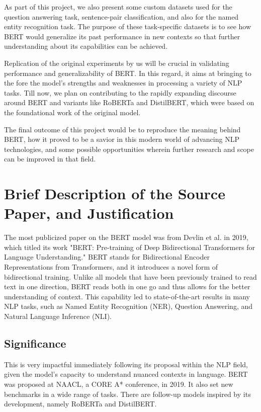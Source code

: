 \documentclass{article}
\begin{document}
As part of this project, we also present some custom datasets used for the question answering task, sentence-pair classification, and also for the named entity recognition task. The purpose of these task-specific datasets is to see how BERT would generalize its past performance in new contexts so that further understanding about its capabilities can be achieved.

Replication of the original experiments by us will be crucial in validating performance and generalizability of BERT. In this regard, it aims at bringing to the fore the model's strengths and weaknesses in processing a variety of NLP tasks. Till now, we plan on contributing to the rapidly expanding discourse around BERT and variants like RoBERTa and DistilBERT, which were based on the foundational work of the original model.

The final outcome of this project would be to reproduce the meaning behind BERT, how it proved to be a savior in this modern world of advancing NLP technologies, and some possible opportunities wherein further research and scope can be improved in that field.

\section{Brief Description of the Source Paper, and Justification}
The most publicized paper on the BERT model was from Devlin et al. in 2019, which titled its work "BERT: Pre-training of Deep Bidirectional Transformers for Language Understanding." BERT stands for Bidirectional Encoder Representations from Transformers, and it introduces a novel form of bidirectional training. Unlike all models that have been previously trained to read text in one direction, BERT reads both in one go and thus allows for the better understanding of context. This capability led to state-of-the-art results in many NLP tasks, such as Named Entity Recognition (NER), Question Answering, and Natural Language Inference (NLI).

\subsection{Significance}
This is very impactful immediately following its proposal within the NLP field, given the model's capacity to understand nuanced contexts in language. BERT was proposed at NAACL, a CORE A* conference, in 2019. It also set new benchmarks in a wide range of tasks. There are follow-up models inspired by its development, namely RoBERTa and DistilBERT.
\end{document}
